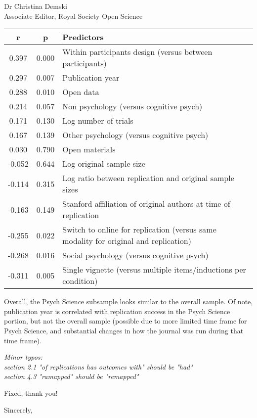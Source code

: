 \documentclass{stanfordletter}
\newcommand{\theysaid}[1]{\begin{leftbar} \noindent 
		\textsl{ #1}\end{leftbar}}
\begin{document}
\begin{letter}{Dr Christina Demski \\ Associate Editor, Royal Society Open Science}
\begin{center}
          \fontsize{10}{12}\selectfont
          \begin{tabular}[t]{ccl}
          	\toprule
          	r & p & Predictors\\
          	\midrule
          	0.397 & 0.000 & Within participants design (versus between participants)\\
          	0.297 & 0.007 & Publication year\\
          	0.288 & 0.010 & Open data\\
          	0.214 & 0.057 & Non psychology (versus cognitive psych)\\
          	0.171 & 0.130 & Log number of  trials\\
          	0.167 & 0.139 & Other psychology (versus cognitive psych)\\
          	0.030 & 0.790 & Open materials\\
          	-0.052 & 0.644 & Log original sample size\\
          	-0.114 & 0.315 & Log ratio between replication and original sample sizes\\
          	-0.163 & 0.149 & Stanford affiliation of original authors at time of replication\\
          	-0.255 & 0.022 & Switch to online for replication (versus same modality for original and replication)\\
          	-0.268 & 0.016 & Social psychology (versus cognitive psych)\\
          	-0.311 & 0.005 & Single vignette (versus multiple items/inductions per condition)\\
          	\bottomrule
          \end{tabular}
          \end{center}

Overall, the Psych Science subsample looks similar to the overall sample. Of note, publication year is correlated with replication success in the Psych Science portion, but not the overall sample (possible due to more limited time frame for Psych Science, and substantial changes in how the journal was run during that time frame).



          	\theysaid{
          	Minor typos:\\
          	section 2.1 "of replications has outcomes with" should be "had"\\
          	section 4.3 "ramapped" should be "remapped"
          }
          Fixed, thank you!
          
          
          \closing{Sincerely,}
		
	\end{letter}
	
\end{document}
